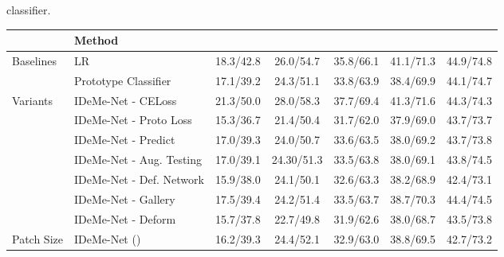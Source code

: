 \documentclass[10pt,letterpaper,twocolumn]{article}
\providecommand{\tabularnewline}{\\}
\begin{document}
classifier.\begin{table*}
\begin{centering}
\begin{tabular}{llccccc}
\hline 
 & {\small{}{}{}{}{}{}Method  } & {\small{}{}{}{}{}{}  } & {\small{}{}{}{}{}{}  } & {\small{}{}{}{}{}{}  } & {\small{}{}{}{}{}{}  } & {\small{}{}{}{}{}{} }\tabularnewline
\hline 
\hline 
\multirow{2}{*}{{\small{}Baselines }} & {\small{}{}{}{}{}{}LR  } & {\small{}{}{}{}{}{}18.3/42.8  } & {\small{}{}{}{}{}{}26.0/54.7  } & {\small{}{}{}{}{}{}35.8/66.1  } & {\small{}{}{}{}{}{}41.1/71.3  } & {\small{}{}{}{}{}{}44.9/74.8 }\tabularnewline
 & {\small{}{}{}{}{}{}Prototype Classifier  } & {\small{}{}{}{}{}{}17.1/39.2  } & {\small{}{}{}{}{}{}24.3/51.1  } & {\small{}{}{}{}{}{}33.8/63.9  } & {\small{}{}{}{}{}{}38.4/69.9  } & {\small{}{}{}{}{}{}44.1/74.7 }\tabularnewline
\hline 
\multirow{7}{*}{{\small{}Variants }} & {\small{}{}{}{}{}{}IDeMe-Net - CELoss  } & {\small{}{}{}{}{}{}21.3/50.0  } & {\small{}{}{}{}{}{}28.0/58.3  } & {\small{}{}{}{}{}{}37.7/69.4  } & {\small{}{}{}{}{}{}41.3/71.6  } & {\small{}{}{}{}{}{}44.3/74.3 }\tabularnewline
 & {\small{}{}{}{}{}IDeMe-Net - Proto Loss  } & {\small{}{}{}{}{}{}15.3/36.7  } & {\small{}{}{}{}{}{}21.4/50.4  } & {\small{}{}{}{}{}{}31.7/62.0  } & {\small{}{}{}{}{}{}37.9/69.0  } & {\small{}{}{}{}{}{}43.7/73.7}\tabularnewline
 & {\small{}{}{}{}{}{}IDeMe-Net - Predict
 } & {\small{}{}{}{}{}{}17.0/39.3  } & {\small{}{}{}{}{}{}24.0/50.7  } & {\small{}{}{}{}{}{}33.6/63.5  } & {\small{}{}{}{}{}{}38.0/69.2  } & {\small{}{}{}{}{}{}43.7/73.8 }\tabularnewline
 & {\small{}{}{}{}{}{}IDeMe-Net - Aug. Testing  } & {\small{}{}{}{}{}{}17.0/39.1  } & {\small{}{}{}{}{}{}24.30/51.3  } & {\small{}{}{}{}{}{}33.5/63.8  } & {\small{}{}{}{}{}{}38.0/69.1  } & {\small{}{}{}{}{}{}43.8/74.5 }\tabularnewline
 & {\small{}{}{}{}{}{}IDeMe-Net - Def. Network  } & {\small{}{}{}{}{}{}15.9/38.0  } & {\small{}{}{}{}{}{}24.1/50.1  } & {\small{}{}{}{}{}{}32.6/63.3  } & {\small{}{}{}{}{}{}38.2/68.9  } & {\small{}{}{}{}{}{}42.4/73.1 }\tabularnewline
 & {\small{}{}{}{}{}IDeMe-Net - Gallery  } & {\small{}{}{}{}{}17.5/39.4  } & {\small{}{}{}{}{}24.2/51.4  } & {\small{}{}{}{}{}33.5/63.7  } & {\small{}{}{}{}{}38.7/70.3  } & {\small{}{}{}{}{}44.4/74.5 }\tabularnewline
 & {\small{}{}{}{}{}IDeMe-Net - Deform  } & {\small{}{}{}{}{}15.7/37.8  } & {\small{}{}{}{}{}22.7/49.8  } & {\small{}{}{}{}{}31.9/62.6  } & {\small{}{}{}{}{}38.0/68.7  } & {\small{}{}{}{}{}43.5/73.8}\tabularnewline
\hline 
\multirow{5}{*}{{\small{}Patch Size }} 
& {\small{}{}{}{}{}{}IDeMe-Net ()  } & {\small{}{}{}{}{}{}16.2/39.3  } & {\small{}{}{}{}{}{}24.4/52.1  } & {\small{}{}{}{}{}{}32.9/63.0  } & {\small{}{}{}{}{}{}38.8/69.5  } & {\small{}{}{}{}{}{}42.7/73.2 }\tabularnewline

\end{tabular}
\end{centering}
\end{table*}
\end{document}
